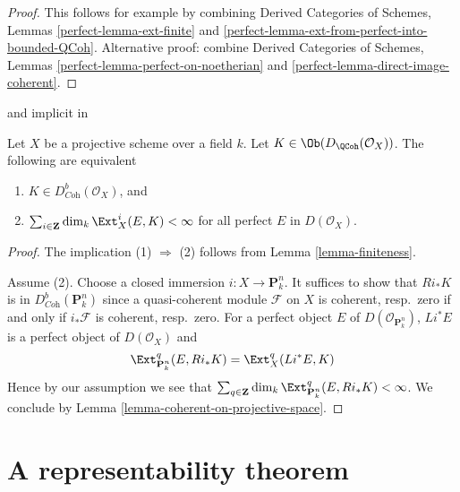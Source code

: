 \begin{proof}
This follows for example by combining
Derived Categories of Schemes, Lemmas \ref{perfect-lemma-ext-finite} and
\ref{perfect-lemma-ext-from-perfect-into-bounded-QCoh}.
Alternative proof: combine
Derived Categories of Schemes, Lemmas
\ref{perfect-lemma-perfect-on-noetherian} and
\ref{perfect-lemma-direct-image-coherent}.
\end{proof}

\begin{lemma}
\label{lemma-characterize-dbcoh-projective}
\begin{reference}
\cite[Lemma 7.46]{Rouquier-dimensions} and implicit in
\cite[Theorem A.1]{BvdB}
\end{reference}
Let $X$ be a projective scheme over a field $k$. Let
$K \in \Ob(D_\QCoh(\mathcal{O}_X))$. The following are equivalent
\begin{enumerate}
\item $K \in D^b_{\textit{Coh}}(\mathcal{O}_X)$, and
\item $\sum_{i \in \mathbf{Z}} \dim_k \Ext^i_X(E, K) < \infty$
for all perfect $E$ in $D(\mathcal{O}_X)$.
\end{enumerate}
\end{lemma}

\begin{proof}
The implication (1) $\Rightarrow$ (2) follows from
Lemma \ref{lemma-finiteness}.

\medskip\noindent
Assume (2).
Choose a closed immersion $i : X \to \mathbf{P}^n_k$. It suffices to show
that $Ri_*K$ is in $D^b_{\textit{Coh}}(\mathbf{P}^n_k)$ since a quasi-coherent
module $\mathcal{F}$ on $X$ is coherent, resp.\ zero if and only if
$i_*\mathcal{F}$ is coherent, resp.\ zero. For a perfect object $E$
of $D(\mathcal{O}_{\mathbf{P}^n_k})$, $Li^*E$ is a perfect object of
$D(\mathcal{O}_X)$ and
$$
\Ext^q_{\mathbf{P}^n_k}(E, Ri_*K) = \Ext^q_X(Li^*E, K)
$$
Hence by our assumption we see that
$\sum_{q \in \mathbf{Z}} \dim_k \Ext^q_{\mathbf{P}^n_k}(E, Ri_*K) < \infty$.
We conclude by Lemma \ref{lemma-coherent-on-projective-space}.
\end{proof}





\section{A representability theorem}
\label{section-bondal-van-den-bergh}

